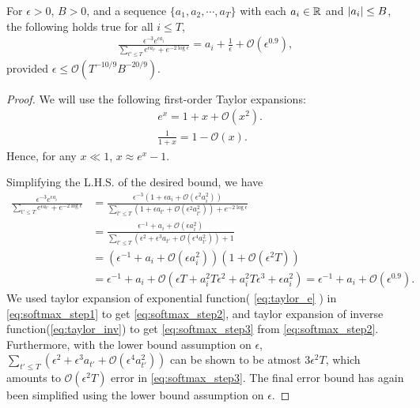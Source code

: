  \begin{lemma}\label{lem:softmax_appr}
     For $\epsilon > 0$, $B > 0$, and a sequence $\{a_1, a_2, \cdots, a_T\}$ with each $a_i \in \mathbb{R}$ and $\left| a_i \right| \le B$, the following holds true for all $i \le T$,
     \begin{align*}
           \frac{ \epsilon^{-3} e^{ 
\epsilon a_{i} } }{ \sum_{ t' \le T } e^{ \epsilon a_{t'}  } + e^{ -2 \log \epsilon } } = a_{i}  + \frac{1}{\epsilon} + \mathcal{O}\left( \epsilon^{0.9} \right) ,
     \end{align*}
     provided $\epsilon \le \mathcal{O}( T^{-10/9} B^{-20/9} ).$
 \end{lemma}

 \begin{proof}
      We will use the following first-order Taylor expansions:
    \begin{align}
        &e^x = 1 + x + \mathcal{O}(x^2) \label{eq:taylor_e}. \\
        & \frac{1}{1+x} = 1 - \mathcal{O}(x). \label{eq:taylor_inv}
    \end{align}
    Hence, for any $x \ll 1$, $x \approx e^x - 1.$ 

    Simplifying the L.H.S. of the desired bound, we have
    \begin{align}
         \frac{ \epsilon^{-3} e^{ 
\epsilon a_{i} } }{ \sum_{ t' \le T } e^{ \epsilon a_{t'}  } + e^{ -2 \log \epsilon } }  &= \frac{ \epsilon^{-3}  (1 + \epsilon a_i + \mathcal{O}(\epsilon^2 a_i^2) ) }{ \sum_{ t' \le T } (1 + \epsilon a_{t'} + \mathcal{O} (\epsilon^2 a_{t'}^2)  ) + e^{ -2 \log \epsilon } } \label{eq:softmax_step1} \\&
= \frac{ \epsilon^{-1} +  a_i + \mathcal{O}(\epsilon a_i^2)  }{ \sum_{ t' \le T } (\epsilon^{2} + \epsilon^3 a_{t'} + \mathcal{O} (\epsilon^4 a_{t'}^2)  ) + 1 } \label{eq:softmax_step2} \\&
= \left(  \epsilon^{-1} +  a_i + \mathcal{O}(\epsilon a_i^2) \right) \left( 1 + \mathcal{O}( \epsilon^2 T)  \right) \label{eq:softmax_step3} \\&
= \epsilon^{-1} + a_i + \mathcal{O}( \epsilon T + a_i^2 T \epsilon^2 + a_i^2 T \epsilon^3 + \epsilon a_i^2 ) = \epsilon^{-1} + a_i +  \mathcal{O}( \epsilon^{0.9} ). \nonumber
    \end{align}
    We used taylor expansion of exponential function( \cref{eq:taylor_e} ) in \cref{eq:softmax_step1} to get \cref{eq:softmax_step2}, and taylor expansion of inverse function(\cref{eq:taylor_inv}) to get \cref{eq:softmax_step3} from \cref{eq:softmax_step2}. Furthermore, with the lower bound assumption on $\epsilon$, $\sum_{ t' \le T } (\epsilon^{2} + \epsilon^3 a_{t'} + \mathcal{O} (\epsilon^4 a_{t'}^2)  )$ can be shown to be atmost $3\epsilon^2T$, which amounts to $\mathcal{O}(\epsilon^2 T)$ error in \cref{eq:softmax_step3}. The final error bound has again been simplified using the lower bound assumption on $\epsilon$.
 \end{proof}





